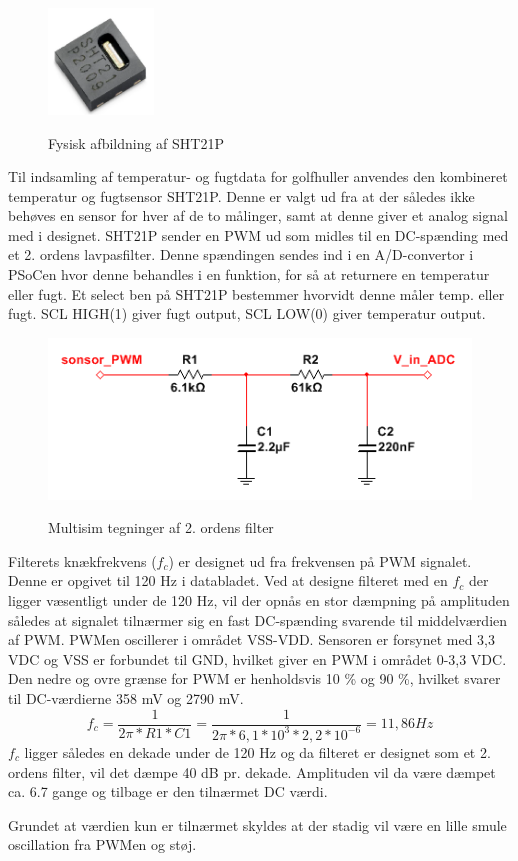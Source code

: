 
\begin{figure}[htb]
\centering
{\includegraphics[width=0.25\textwidth]{filer/design/Billeder/sht21p_fysisk.png}}
\caption{Fysisk afbildning af SHT21P}
\label{lab:sht_filter}
\end{figure}

Til indsamling af temperatur- og fugtdata for golfhuller anvendes den kombineret temperatur og fugtsensor SHT21P. Denne er valgt ud fra at der således ikke behøves en sensor for hver af de to målinger, samt at denne giver et analog signal med i designet. SHT21P sender en PWM ud som midles til en DC-spænding med et 2. ordens lavpasfilter. Denne spændingen sendes ind i en A/D-convertor i PSoCen hvor denne behandles i en funktion, for så at returnere en temperatur eller fugt. Et select ben på SHT21P bestemmer hvorvidt denne måler temp. eller fugt. SCL HIGH(1) giver fugt output, SCL LOW(0) giver temperatur output.

\begin{figure}[htb]
\centering
{\includegraphics{filer/design/Billeder/sht21p_filter_pic.png}}
\caption{Multisim tegninger af 2. ordens filter}
\label{lab:sht_filter}
\end{figure}

Filterets knækfrekvens ($f_c$) er designet ud fra frekvensen på PWM signalet. Denne er opgivet til 120 Hz i databladet. Ved at designe filteret med en $f_c$ der ligger væsentligt under de 120 Hz, vil der opnås en stor dæmpning på amplituden således at signalet tilnærmer sig en fast DC-spænding svarende til middelværdien af PWM. PWMen oscillerer i området VSS-VDD. Sensoren er forsynet med 3,3 VDC og VSS er forbundet til GND, hvilket giver en PWM i området 0-3,3 VDC. Den nedre og ovre grænse for PWM er henholdsvis 10 \% og 90 \%, hvilket svarer til DC-værdierne 358 mV og 2790 mV.
\begin{equation}
f_c = \frac{1}{2 \pi * R1 * C1} = \frac{1}{2 \pi * 6,1*10^3  * 2,2*10^{-6}} = 11,86 Hz
\end{equation}
$f_c$ ligger således en dekade under de 120 Hz og da filteret er designet som et 2. ordens filter, vil det dæmpe 40 dB pr. dekade. Amplituden vil da være dæmpet ca. 6.7 gange og tilbage er den tilnærmet DC værdi. 

Grundet at værdien kun er tilnærmet skyldes at der stadig vil være en lille smule oscillation fra PWMen og støj.
